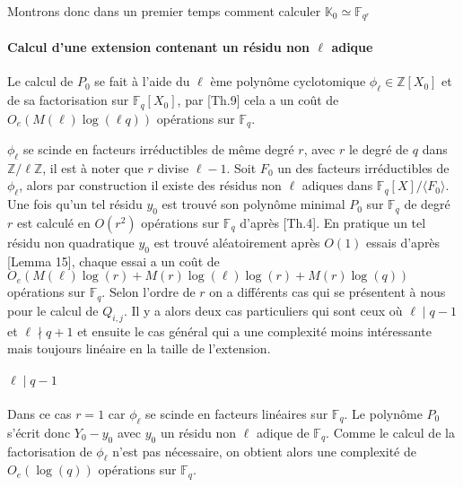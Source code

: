 \documentclass[10pt,a4paper]{book}
\theoremstyle{plain}
\theoremstyle{definition}
\theoremstyle{definition}
\theoremstyle{definition}
\theoremstyle{definition}
\theoremstyle{remark}
\theoremstyle{remark}
\begin{document}
Montrons donc dans un premier temps comment calculer $\mathbb{K}_0 \simeq \mathbb{F}_{q^r}$



\paragraph{Calcul d'une extension contenant un résidu non $\ell$ adique}
Le calcul de $P_0$ se fait à l'aide du $\ell$ ème polynôme cyclotomique $\phi_{\ell} \in \mathbb{Z}[X_0]$ et de sa factorisation sur $\mathbb{F}_q[X_0]$, par \cite{Shoup93}[Th.9] cela a un coût de $O_e(M(\ell)\log(\ell q))$ opérations sur $\mathbb{F}_q$.

$\phi_{\ell}$ se scinde en facteurs irréductibles de même degré $r$, avec $r$ le degré de $q$ dans $\mathbb{Z}/\ell \mathbb{Z}$, il est à noter que $r$ divise $\ell-1$. Soit $F_0$ un des facteurs irréductibles de $\phi_{\ell}$, alors par construction il existe des résidus non $\ell$ adiques dans $\mathbb{F}_q[X]/\langle F_0 \rangle$. Une fois qu'un tel résidu $y_0$ est trouvé son polynôme minimal $P_0$ sur $\mathbb{F}_q$ de degré $r$ est calculé en $O(r^2)$ opérations sur $\mathbb{F}_q$ d'après \cite{Shoup93}[Th.4]. 
En pratique un tel résidu non quadratique $y_0$ est trouvé aléatoirement après $O(1)$ essais d'après \cite{Shoup93}[Lemma 15], chaque essai a un coût de $O_e(M(\ell)\log(r)+M(r)\log(\ell)\log(r)+M(r)\log(q))$ opérations sur $\mathbb{F}_q$.
Selon l'ordre de $r$ on a différents cas qui se présentent à nous pour le calcul de $Q_{i,j}$. Il y a alors deux cas particuliers qui sont ceux où $\ell \mid q-1$ et $\ell \nmid q+1$ et ensuite le cas général qui a une complexité moins intéressante mais toujours linéaire en la taille de l'extension.

\paragraph{$\ell \mid q-1$}\label{par:easycase}
Dans ce cas $r=1$ car $\phi_{\ell}$ se scinde en facteurs linéaires sur $\mathbb{F}_q$. Le polynôme $P_0$ s'écrit donc $Y_0-y_0$ avec $y_0$ un résidu non $\ell$ adique de $\mathbb{F}_q$. Comme le calcul de la factorisation de $\phi_{\ell}$ n'est pas nécessaire, on obtient alors une complexité de $O_e(\log(q))$ opérations sur $\mathbb{F}_q$.
\end{document}
